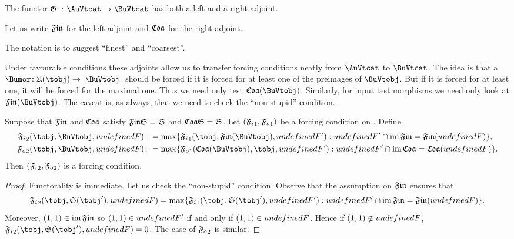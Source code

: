 \documentclass[%
a4paper,%
arxiv,%
defaults
]{myclass}
\begin{document}
\begin{corollary}
The functor \(\mVo{\subfunc} \colon \AuVtcat \to \BuVtcat\) has both a left and a right adjoint. \noproof
\end{corollary}

\begin{defn}
Let us write \(\finfunc\) for the left adjoint and \(\coafunc\) for the right adjoint.
\end{defn}

The notation is to suggest ``finest'' and ``coarsest''.

Under favourable conditions these adjoints allow us to transfer forcing conditions neatly from \(\AuVtcat\) to \(\BuVtcat\).
The idea is that a \Bumor \(\Bumor \colon \ufunc(\tobj) \to \sabs{\BuVtobj}\) should be forced if it is forced for at least one of the preimages of \(\BuVtobj\).
But if it is forced for at least one, it will be forced for the maximal one.
Thus we need only test \(\coafunc(\BuVtobj)\).
Similarly, for input test morphisms we need only look at \(\finfunc(\BuVtobj)\).
The caveat is, as always, that we need to check the ``non\hyp{}stupid'' condition.

\begin{proposition}
Suppose that \(\finfunc\) and \(\coafunc\) satisfy \(\finfunc \sfunc = \sfunc\) and \(\coafunc \sfunc = \sfunc\).
Let \((\mAo{\iforce}, \mAo{\oforce})\) be a forcing condition on \AuVtobjs.
Define
%
\begin{align*}
  \mBo{\iforce}(\tobj, \BuVtobj, \m{F}) &\coloneqq \max\{\mAo{\iforce}(\tobj, \finfunc(\BuVtobj), \m{F}') : \m{F}' \cap \im \finfunc = \finfunc (\m{F})\}, \\
  \mBo{\oforce}(\tobj, \BuVtobj, \m{F}) &\coloneqq \max\{\mAo{\oforce}(\coafunc(\BuVtobj), \tobj, \m{F}') : \m{F}' \cap \im \coafunc = \coafunc (\m{F})\}.
\end{align*}
%
Then \((\mBo{\iforce}, \mBo{\oforce})\) is a forcing condition.
\end{proposition}

\begin{proof}
Functorality is immediate.
Let us check the ``non\hyp{}stupid'' condition.
Observe that the assumption on \(\finfunc\) ensures that
%
\[
  \mBo{\iforce}(\tobj, \sfunc(\tobj'), \m{F}) = \max\{\mAo{\iforce}(\tobj, \sfunc(\tobj'), \m{F}') : \m{F}' \cap \im \finfunc = \finfunc (\m{F})\}.
\]
%
Moreover, \((1,1) \in \im\finfunc\) so \((1,1) \in \m{F}'\) if and only if \((1, 1) \in \m{F}\).
Hence if \((1,1) \notin \m{F}\), \(\mBo{\iforce}(\tobj, \sfunc(\tobj'), \m{F}) = 0\).
The case of \(\mBo{\oforce}\) is similar.
\end{proof}
\end{document}
